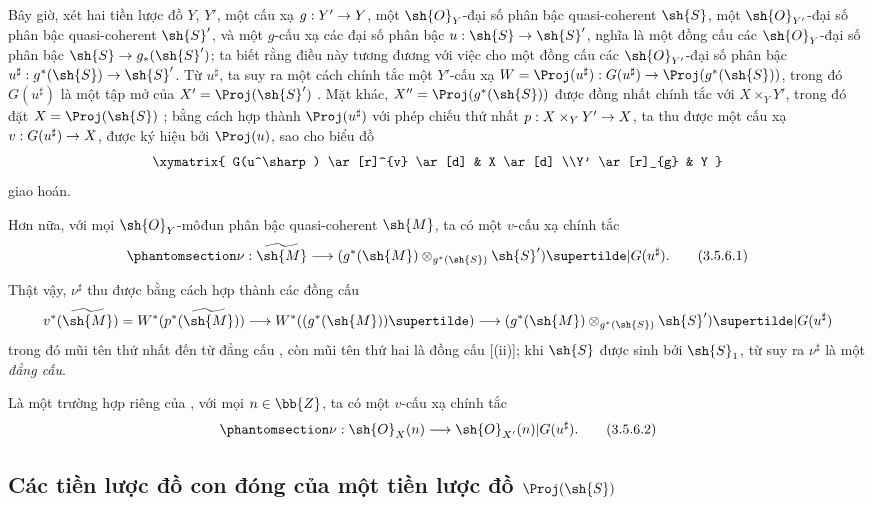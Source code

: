\documentclass[oneside,10pt]{amsart}
\makeatletter
\newcommand{\ega@arrow}[2]{\mathchoice{#1}{#2}{#2}{#2}}
\renewcommand{\to}{\ega@arrow{\longrightarrow}{\rightarrow}}
\newcommand{\oldpage}[2][]{\marginnote{\normalfont\footnotesize\textbf{#1}~|~#2}\ignorespaces}
\let\EGAOriginalLabel\label
\renewcommand{\label}[1]{\phantomsection\EGAOriginalLabel{#1}}
\makeatother
\begin{document}
\begin{env}[3.5.6]
\label{II.3.5.6}
Bây giờ, xét hai tiền lược đồ $Y$, $Y'$, một cấu xạ $g:Y'\to Y$, một $\sh{O}_Y$-đại số phân bậc quasi-coherent $\sh{S}$, một $\sh{O}_{Y'}$-đại số phân bậc quasi-coherent $\sh{S}'$, và một $g$-cấu xạ các đại số phân bậc $u:\sh{S}\to\sh{S}'$, nghĩa là một đồng cấu các $\sh{O}_Y$-đại số phân bậc $\sh{S}\to g_*(\sh{S}')$;
ta biết rằng điều này tương đương với việc cho một đồng cấu các $\sh{O}_{Y'}$-đại số phân bậc $u^\sharp:g^*(\sh{S})\to\sh{S}'$.
Từ $u^\sharp$, ta suy ra một cách chính tắc một $Y'$-cấu xạ $W=\Proj(u^\sharp):G(u^\sharp)\to\Proj(g^*(\sh{S}))$, trong đó $G(u^\sharp)$ là một tập mở của $X'=\Proj(\sh{S}')$ .
Mặt khác, $X''=\Proj(g^*(\sh{S}))$ được đồng nhất
\oldpage[II]{64}
chính tắc với $X\times_Y Y'$, trong đó đặt $X=\Proj(\sh{S})$ ;
bằng cách hợp thành $\Proj(u^\sharp)$ với phép chiếu thứ nhất $p:X\times_Y Y'\to X$, ta thu được một cấu xạ $v:G(u^\sharp)\to X$, được ký hiệu bởi $\Proj(u)$, sao cho biểu đồ
\[
  \xymatrix{
    G(u^\sharp) \ar[r]^{v} \ar[d]
    & X \ar[d]
  \\Y' \ar[r]_{g}
    & Y
  }
\]
giao hoán.

Hơn nữa, với mọi $\sh{O}_Y$-môđun phân bậc quasi-coherent $\sh{M}$, ta có một $v$-cấu xạ chính tắc
\[
\label{II.3.5.6.1}
  \nu:\widetilde{\sh{M}}\to(g^*(\sh{M})\otimes_{g^*(\sh{S})}\sh{S}')\supertilde|G(u^\sharp).
\tag{3.5.6.1}
\]

Thật vậy, $\nu^\sharp$ thu được bằng cách hợp thành các đồng cấu
\[
  v^*(\widetilde{\sh{M}})
  =W^*(p^*(\widetilde{\sh{M}}))
  \to W^*((g^*(\sh{M}))\supertilde)
  \to (g^*(\sh{M})\otimes_{g^*(\sh{S})}\sh{S}')\supertilde|G(u^\sharp)
\]
trong đó mũi tên thứ nhất đến từ đẳng cấu , còn mũi tên thứ hai là đồng cấu [(ii)];
khi $\sh{S}$ được sinh bởi $\sh{S}_1$, từ  suy ra $\nu^\sharp$ là một \emph{đẳng cấu}.

Là một trường hợp riêng của , với mọi $n\in\bb{Z}$, ta có một $v$-cấu xạ chính tắc
\[
\label{II.3.5.6.2}
  \nu:\sh{O}_X(n)\to\sh{O}_{X'}(n)|G(u^\sharp).
\tag{3.5.6.2}
\]
\end{env}

\subsection{Các tiền lược đồ con đóng của một tiền lược đồ $\Proj(\sh{S})$}
\label{subsection:II.3.6}
\end{document}
